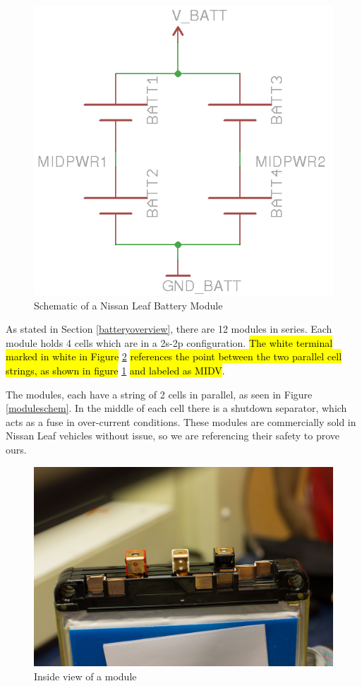 \documentclass{article}
\DeclareRobustCommand{\hlr}[1]{{\sethlcolor{red}\hl{#1}}}
\begin{document}
            \begin{figure}[H]
            \centering
            \includegraphics{moduleschem}
            \caption{Schematic of a Nissan Leaf Battery Module}
            \label{module}
            \end{figure}

            As stated in Section \ref{batteryoverview}, there are 12 modules in series. Each module holds 4 cells which are in a 2s-2p configuration. \hlr{The white terminal marked in white in Figure} \ref{canopener} \hlr{references the point between the two parallel cell strings, as shown in figure} \ref{module} \hlr{and labeled as MIDV}.

            The modules, each have a string of 2 cells in parallel, as seen in Figure \ref{moduleschem}. In the middle of each cell there is a shutdown separator, which acts as a fuse in over-current conditions. These modules are commercially sold in Nissan Leaf vehicles without issue, so we are referencing their safety to prove ours.

            \begin{figure}[H]
                \centering
                \includegraphics[width = 0.6 \textwidth]{OpenModule}
                \caption{Inside view of a module}
                \label{canopener}
            \end{figure}
\end{document}
